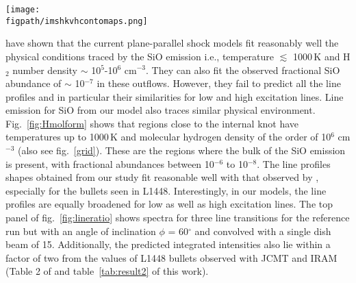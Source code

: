 \documentclass[useAMS,usenatbib]{mn2e}
\newcommand{\figpath}{/Users/bhargavvaidya/MyProject/work/Leeds_Uni/SiOJets_New/PAPER/PFIGS/}
\begin{document}
\begin{figure*}
 \texttt{[image: \\figpath/imshkvhcontomaps.png]}
 \caption{Symmetrical contour maps of multi-line integrated SiO
   emission convolved with a 2\arcsec beam obtained using parameters of the reference run. The contour colors represent different intenties in Kelvins, i.e,
   30.0({\it red}), 10.0({\it green}), 5.0({\it blue}), 1.0({\it
     magenta}), 0.5({\it cyan}), 0.1({\it black}).} 
\label{fig:ltconts}
\end{figure*}

\cite{Nisini:2007p13128} have shown that the current
plane-parallel shock models fit reasonably well the physical
conditions traced by the SiO emission i.e., temperature $\lesssim$
1000\,K and H$_{2}$ number density $\sim$ 10$^{5}$-10$^{6}$
cm$^{-3}$. They can also fit the observed fractional SiO abundance of
$\sim$ 10$^{-7}$ in these outflows. However, they fail to predict all
the line profiles and in particular their similarities for low and
high excitation lines. Line emission for SiO from our model also traces similar
physical environment. Fig.~\ref{fig:Hmolform} shows that regions close
to the internal knot have temperatures up to 1000\,K and molecular
hydrogen density of the order of 10$^{6}$ cm$^{-3}$ (also see
fig.~\ref{grid}). These are the regions where the bulk of the SiO
emission is present, with fractional abundances between 10$^{-6}$ to 10$^{-8}$.
The line profiles shapes obtained from our study fit reasonable well with that observed by
\cite{Nisini:2007p13128}, especially for the bullets seen in
L1448. Interestingly, in our models, the line profiles are equally broadened for low as well
as high excitation lines. The top panel of fig.~\ref{fig:lineratio} shows spectra for three line
transitions for the reference run but with an angle of inclination
$\phi$ = 60$^{\circ}$ and convolved with a single dish beam of
15\arcsec. Additionally, the predicted integrated
intensities also lie within a factor of two from the values of L1448 bullets
observed with JCMT and IRAM (Table 2 of \citealt{Nisini:2007p13128}  and
table~\ref{tab:result2} of this work).
%
\end{document}
